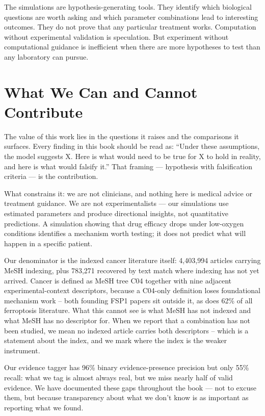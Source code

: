 \documentclass[11pt,twoside,openright]{report}
\begin{document}
The simulations are hypothesis-generating tools. They identify which biological questions are worth asking and which parameter combinations lead to interesting outcomes. They do not prove that any particular treatment works. Computation without experimental validation is speculation. But experiment without computational guidance is inefficient when there are more hypotheses to test than any laboratory can pursue.

\section{What We Can and Cannot Contribute}

The value of this work lies in the questions it raises and the comparisons it surfaces. Every finding in this book should be read as: ``Under these assumptions, the model suggests X. Here is what would need to be true for X to hold in reality, and here is what would falsify it.'' That framing --- hypothesis with falsification criteria --- is the contribution.

What constrains it: we are not clinicians, and nothing here is medical advice or treatment guidance. We are not experimentalists --- our simulations use estimated parameters and produce directional insights, not quantitative predictions. A simulation showing that drug efficacy drops under low-oxygen conditions identifies a mechanism worth testing; it does not predict what will happen in a specific patient.

Our denominator is the indexed cancer literature itself: 4,403,994 articles carrying MeSH indexing, plus 783,271 recovered by text match where indexing has not yet arrived. Cancer is defined as MeSH tree C04 together with nine adjacent experimental-context descriptors, because a C04-only definition loses foundational mechanism work -- both founding FSP1 papers sit outside it, as does 62\% of all ferroptosis literature. What this cannot see is what MeSH has not indexed and what MeSH has no descriptor for. When we report that a combination has not been studied, we mean no indexed article carries both descriptors -- which is a statement about the index, and we mark where the index is the weaker instrument.

Our evidence tagger has 96\% binary evidence-presence precision but only 55\% recall: what we tag is almost always real, but we miss nearly half of valid evidence. We have documented these gaps throughout the book --- not to excuse them, but because transparency about what we don't know is as important as reporting what we found.
\end{document}
